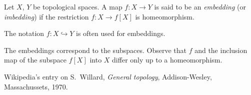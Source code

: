 \documentclass[12pt]{article}
\newcommand{\Map}[3]{#1:#2\to#3}
\newcommand{\Emb}[3]{#1:#2\hookrightarrow#3}
\newcommand{\Img}[2]{#1[#2]}
\begin{document}
Let $X$, $Y$ be topological spaces. A map $\Map fXY$ is said to be an \emph{embedding} (or \emph{imbedding}) if the restriction $\Map fX{\Img fX}$ is homeomorphism.

The notation $\Emb fXY$ is often used for embeddings.

The embeddings correspond to the subspaces. Observe that $f$ and the inclusion map of the subspace $\Img fX$ into $X$ differ only up to a homeomorphism.

\begin{thebibliography}{9}
 Wikipedia's entry on 
S.~Willard, \emph{General topology}, Addison-Wesley, Massachussets, 1970.
\end{thebibliography}
\end{document}
